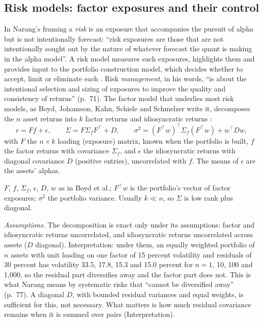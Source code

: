 \subsection{Risk models: factor exposures and their control}

\begin{qfmodel}\label{mod:factor-risk-model}
 In Narang's framing a \emph{risk} is an exposure that accompanies the pursuit of alpha but is not intentionally forecast: ``risk exposures are those that are not intentionally sought out by the nature of whatever forecast the quant is making in the alpha model''. A risk model measures such exposures, highlights them and provides input to the portfolio construction model, which decides whether to accept, limit or eliminate each \citep[chap.~4, ``Risk Models'', pp.~71--73]{s7-narang}. Risk \emph{management}, in his words, ``is about the intentional selection and sizing of exposures to improve the quality and consistency of returns'' (p.~71). The factor model that underlies most risk models, as Boyd, Johansson, Kahn, Schiele and Schmelzer write it, decomposes the $n$ asset returns into $k$ factor returns and idiosyncratic returns \citep[author version of 5 Jan.\ 2024, sec.~3.3, eq.~(14), pp.~20--21]{wide-boyd-markowitz-seventy}:
\[ r=Ff+\epsilon,\qquad \Sigma=F\Sigma_fF^\top+D,\qquad \sigma^2=(F^\top w)^\top\Sigma_f(F^\top w)+w^\top Dw, \]
with $F$ the $n\times k$ loading (exposure) matrix, known when the portfolio is built, $f$ the factor returns with covariance $\Sigma_f$, and $\epsilon$ the idiosyncratic returns with diagonal covariance $D$ (positive entries), uncorrelated with $f$. The means of $\epsilon$ are the assets' alphas.

 $F$, $f$, $\Sigma_f$, $\epsilon$, $D$, $w$ as in Boyd et al.; $F^\top w$ is the portfolio's vector of factor exposures; $\sigma^2$ the portfolio variance. Usually $k\ll n$, so $\Sigma$ is low rank plus diagonal.

 \emph{Assumptions.} The decomposition is exact only under its assumptions: factor and idiosyncratic returns uncorrelated, and idiosyncratic returns uncorrelated across assets ($D$ diagonal). Interpretation: under them, an equally weighted portfolio of $n$ assets with unit loading on one factor of 15 percent volatility and residuals of 30 percent has volatility 33.5, 17.8, 15.3 and 15.0 percent for $n=1$, 10, 100 and 1{,}000, so the residual part diversifies away and the factor part does not. This is what Narang means by systematic risks that ``cannot be diversified away'' (p.~77). A diagonal $D$, with bounded residual variances and equal weights, is sufficient for this, not necessary. What matters is how much residual covariance remains when it is summed over pairs (Interpretation).


\end{qfmodel}
